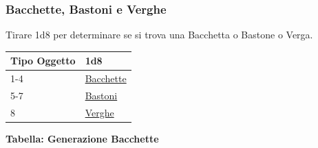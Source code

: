 \begin{multicols}{2}
{\subsubsection{Bacchette, Bastoni e Verghe}\hypertarget{bastonibacchette}{}\label{bastonibacchette}

Tirare 1d8 per determinare se si trova una Bacchetta o Bastone o Verga.

\medskip

{\small\begin{tabularx}{\linewidth}{ll}
		\toprule
\rowcolor{gray!20}\textbf{Tipo Oggetto}&\textbf{1d8}\\
\toprule
1-4&\hyperlink{Bacchette}{Bacchette}\\
\rowcolor{gray!20}5-7&\hyperlink{Bastoni}{Bastoni}\\
8  &\hyperlink{Verghe}{Verghe}\\
\end{tabularx}}

\medskip

\textbf{Tabella: Generazione Bacchette}\hypertarget{Bacchette}{}

\medskip

}
\end{multicols}
